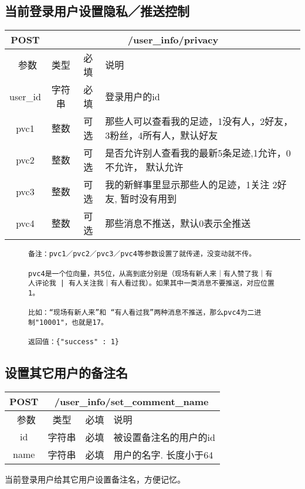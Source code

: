 \subsection{当前登录用户设置隐私／推送控制}

\begin{table}[H]
   \begin{center}
\begin{tabular}{|c|c|c|p{12cm}|}
\hline
POST & \multicolumn{3}{|c|}{/user\_info/privacy} \\
\hline\hline
 \  参数  & 类型 & 必填 &  说明  \\
\hline
 user\_id  & 字符串 & 必填 &  登录用户的id\\
\hline
 pvc1  & 整数 & 可选 &  那些人可以查看我的足迹，1没有人，2好友，3粉丝，4所有人，默认好友\\
\hline
 pvc2  & 整数 & 可选 &  是否允许别人查看我的最新5条足迹,1允许，0不允许， 默认允许\\
\hline
 pvc3  & 整数 & 可选 &  我的新鲜事里显示那些人的足迹，1关注 2好友, 暂时没有用到\\
\hline
 pvc4  & 整数 & 可选 &  那些消息不推送，默认0表示全推送\\
\hline
\end{tabular}
   \end{center}
\end{table}


\begin{figure}[H]
\begin{verbatim}
备注：pvc1／pvc2／pvc3／pvc4等参数设置了就传递，没变动就不传。

pvc4是一个位向量，共5位，从高到底分别是（现场有新人来｜有人赞了我｜有人评论我 | 有人关注我｜有人看过我）。如果其中一类消息不要推送，对应位置1。

比如：“现场有新人来”和 “有人看过我”两种消息不推送，那么pvc4为二进制"10001"，也就是17。

返回值：{"success" : 1}
\end{verbatim}
\end{figure}




\subsection{设置其它用户的备注名}

\begin{table}[H]
   \begin{center}
\begin{tabular}{|c|c|c|p{12cm}|}
\hline
POST & \multicolumn{3}{|c|}{/user\_info/set\_comment\_name} \\
\hline\hline
 \  参数  & 类型 & 必填 &  说明  \\
\hline
 id  & 字符串 & 必填 &  被设置备注名的用户的id\\
\hline
 name  & 字符串 & 必填 &  用户的名字. 长度小于64\\
\hline
\end{tabular}
   \end{center}
\end{table}
当前登录用户给其它用户设置备注名，方便记忆。

